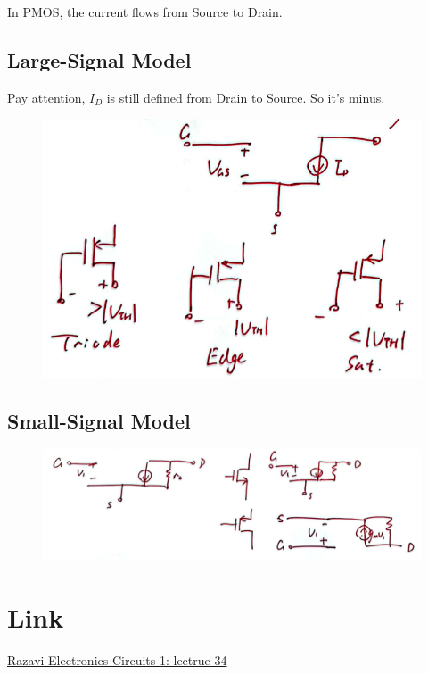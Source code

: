 \documentclass[fontset=windows]{article}
\begin{document}
In PMOS, the current flows from Source to Drain. 

\subsection*{Large-Signal Model}

Pay attention, $I_D$ is still defined from Drain to Source. So it's minus. 

\begin{figure}[htbp]
    \centering
    \includegraphics[scale=0.5]{9.jpg}
    \captionsetup{labelformat=empty}
    \caption{}
    \label{9}
\end{figure}

\subsection*{Small-Signal Model}

\begin{figure}[htbp]
    \centering
    \includegraphics[scale=0.45]{10.jpg}
    \captionsetup{labelformat=empty}
    \caption{}
    \label{10}
\end{figure}

\section*{Link}

\href{https://www.bilibili.com/video/BV1FD4y1R7Ah?p=34&vd_source=1d0c07486a3bd3b0adb8ac548bf6453e}{Razavi Electronics Circuits 1: lectrue 34}
\end{document}
